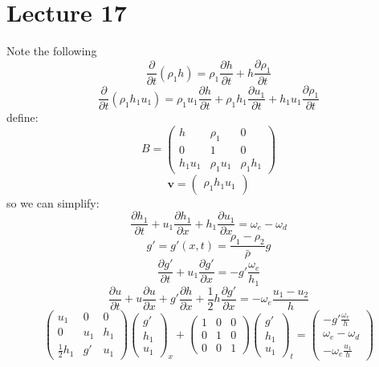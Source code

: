 \documentclass{article}
\begin{document}
         \section{Lecture 17}
         Note the following
         $$
          \frac{\partial}{\partial t} ( \rho_1 h) = \rho_1 \frac{\partial h}{\partial t} + h \frac{\partial \rho_1}{\partial t}
         $$
         $$
         \frac{\partial}{\partial t}( \rho_1 h_1 u_1) = \rho _1 u_1 \frac{\partial h}{\partial t} + \rho_1 h_1 \frac{\partial u_1}{\partial t} + h_1 u_1 \frac{\partial \rho_1}{\partial t} 
         $$
         define:
         $$
          B = \begin{pmatrix} h & \rho_1 & 0\\
                  0 & 1 & 0 \\
          h_1u_1 & \rho_1 u_1 & \rho_1 h_1 \end{pmatrix}
         $$
         $$
         \bm v =
         \begin{pmatrix}
                 \rho_1 h_1 u_1
         \end{pmatrix}
         $$
         so we can simplify:
         $$
          \frac{\partial h_1}{\partial t} + u_1 \frac{\partial h_1}{\partial x} + h_1 \frac{\partial u_1}{\partial x} = \omega_e - \omega_d
         $$
         $$
          g' = g'(x,t) = \frac{\rho_1 - \rho_2}{\bar \rho} g
         $$
         $$
          \frac{\partial g'}{\partial t} + u_1 \frac{\partial g'}{\partial x} = -g' \frac{\omega_e}{h_1}
         $$
         $$
          \frac{\partial u}{\partial t} + u \frac{\partial u}{\partial x} + g' \frac{\partial h}{\partial x} + \frac{1}{2} h \frac{\partial g'}{\partial x} = - \omega_e \frac{u_1 - u_2}{h}
         $$
         $$
          \begin{pmatrix}
                  u_1 & 0 & 0\\
                  0 & u_1 & h_1 \\ \frac{1}{2} h_1 & g' & u_1 \end{pmatrix} \begin{pmatrix} g'\\ h_1 \\ u_1 \end{pmatrix}_x + \begin{pmatrix} 1 & 0 & 0\\ 0 & 1 & 0 \\ 0 & 0 & 1 \end{pmatrix} \begin{pmatrix} g' \\ h_1 \\ u_1 \end{pmatrix}_t = \begin{pmatrix} - g' \frac{\omega_e}{h}\\ \omega_e - \omega_d \\ - \omega_e \frac{u_1}{h} \end{pmatrix}
         $$
\end{document}
